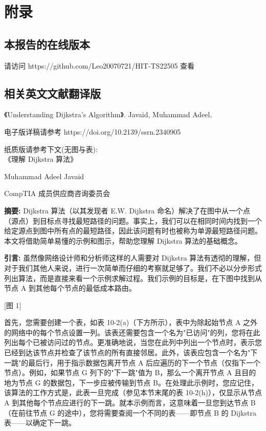 \documentclass[oneside,UTF8]{ctexart}
\numberwithin{figure}{section} %
\begin{document}
\newpage\section{附录}
\subsection{本报告的在线版本}
请访问 https://github.com/Leo20070721/HIT-TS22505 查看
\subsection{相关英文文献翻译版}
《Understanding Dijkstra's Algorithm》. Javaid, Muhammad Adeel. 

电子版详稿请参考 https://doi.org/10.2139/ssrn.2340905

纸质版请参考下文(无图与表):
~\\

《理解 Dijkstra 算法》

Muhammad Adeel Javaid

CompTIA 成员供应商咨询委员会

{\bf 摘要:}
Dijkstra 算法（以其发现者 E.W. Dijkstra 命名）解决了在图中从一个点（源点）到目标点寻找最短路径的问题。事实上，我们可以在相同时间内找到一个给定源点到图中所有点的最短路径，因此该问题有时也被称为单源最短路径问题。本文将借助简单易懂的示例和图示，帮助您理解 Dijkstra 算法的基础概念。

{\bf 引言:}
虽然像网络设计师和分析师这样的人需要对 Dijkstra 算法有透彻的理解，但对于我们其他人来说，进行一次简单而仔细的考察就足够了。我们不必以分步形式列出算法，而是直接来看一个示例求解过程。我们示例的目标是，在下图中找到从节点 A 到其他每个节点的最低成本路由。

[图 1]

首先，您需要创建一个表，如表 10-2(a)（下方所示），表中为除起始节点 A 之外的网络中的每个节点设置一列。该表还需要包含一个名为"已访问"的列，您将在此列出每个已被访问过的节点。更准确地说，当您在此列中列出一个节点时，表示您已经到达该节点并检查了该节点的所有直接邻居。此外，该表应包含一个名为"下一跳"的最后行，用于指示数据包离开节点 A 后应遍历的下一个节点（仅指下一个节点）。例如，如果节点 G 列下的"下一跳"值为 B，那么一个离开节点 A 且目的地为节点 G 的数据包，下一步应被传输到节点 B。在处理此示例时，您应记住，该算法的工作方式是，此表一旦完成（参见本节末尾的表 10-2(h)），仅显示从节点 A 到其他每个节点应进行的下一跳。就本示例而言，这意味着一旦您到达节点 B（在前往节点 G 的途中），您将需要查阅一个不同的表——即节点 B 的 Dijkstra 表——以确定下一跳。
\end{document}
